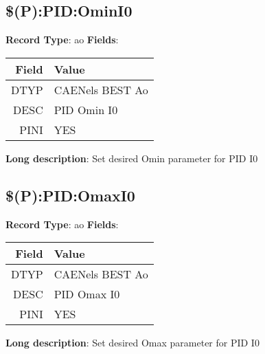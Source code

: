 \subsection{\$(P):PID:OminI0}
\textbf{Record Type}: ao \newline \newline 
\textbf{Fields}: \newline 
\begin{tabularx}{0.7\linewidth}{|r|X|}
\hline Field & Value \\
\hline
\hline
DTYP & CAENels BEST Ao\\
\hline
DESC & PID Omin I0\\
\hline
PINI & YES\\
\hline
\end{tabularx}
\newline \newline \newline
\textbf{Long description}: \newline 
 Set desired Omin parameter for PID I0
\newline \newline

\subsection{\$(P):PID:OmaxI0}
\textbf{Record Type}: ao \newline \newline 
\textbf{Fields}: \newline 
\begin{tabularx}{0.7\linewidth}{|r|X|}
\hline Field & Value \\
\hline
\hline
DTYP & CAENels BEST Ao\\
\hline
DESC & PID Omax I0\\
\hline
PINI & YES\\
\hline
\end{tabularx}
\newline \newline \newline
\textbf{Long description}: \newline 
 Set desired Omax parameter for PID I0
\newline \newline

